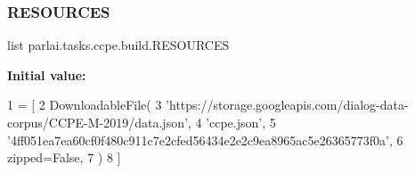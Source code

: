\subsubsection{\texorpdfstring{R\+E\+S\+O\+U\+R\+C\+ES}{RESOURCES}}
{\footnotesize\ttfamily list parlai.\+tasks.\+ccpe.\+build.\+R\+E\+S\+O\+U\+R\+C\+ES}

{\bfseries Initial value\+:}
\begin{DoxyCode}
1 =  [
2     DownloadableFile(
3         \textcolor{stringliteral}{'https://storage.googleapis.com/dialog-data-corpus/CCPE-M-2019/data.json'},
4         \textcolor{stringliteral}{'ccpe.json'},
5         \textcolor{stringliteral}{'4ff051ea7ea60cf0f480c911c7e2cfed56434e2e2c9ea8965ac5e26365773f0a'},
6         zipped=\textcolor{keyword}{False},
7     )
8 ]
\end{DoxyCode}
